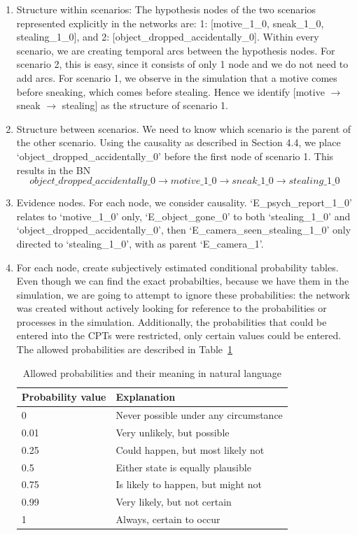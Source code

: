 \documentclass[12pt]{article}
\begin{document}
 \begin{enumerate} 
 
\item Structure within scenarios: The hypothesis nodes of the two scenarios represented explicitly in the networks are: 1: [motive\_1\_0, sneak\_1\_0, stealing\_1\_0], and 2: [object\_dropped\_accidentally\_0]. Within every scenario, we are creating temporal arcs between the hypothesis nodes. For scenario 2, this is easy, since it consists of only 1 node and we do not need to add arcs. For scenario 1, we observe in the simulation that a motive comes before sneaking, which comes before stealing. Hence we identify [motive $\rightarrow$ sneak $\rightarrow$ stealing] as the structure of scenario 1.

\item Structure between scenarios. We need to know which scenario is the parent of the other scenario. Using the causality as described in Section 4.4, we place `object\_dropped\_accidentally\_0' before the first node of scenario 1. This results in the BN \[object\_dropped\_accidentally\_0 \rightarrow motive\_1\_0 \rightarrow sneak\_1\_0 \rightarrow stealing\_1\_0\]

\item Evidence nodes. For each node, we consider causality. `E\_psych\_report\_1\_0' relates to `motive\_1\_0' only, `E\_object\_gone\_0' to both `stealing\_1\_0' and `object\_dropped\_accidentally\_0', then `E\_camera\_seen\_stealing\_1\_0' only directed to `stealing\_1\_0', with as parent `E\_camera\_1'. 

\item For each node, create subjectively estimated conditional probability tables. Even though we can find the exact probabilties, because we have them in the simulation, we are going to attempt to ignore these probabilities: the network was created without actively looking for reference to the probabilities or processes in the simulation. Additionally, the probabilities that could be entered into the CPTs were restricted, only certain values could be entered. The allowed probabilities are described in Table~\ref{atp}


\begin{table}[htbp]
\begin{center}
\begin{tabular}{|l|l|}
\hline
Probability value & Explanation \\
\hline
0 & Never possible under any circumstance \\
0.01 & Very unlikely, but possible \\
0.25 & Could happen, but most likely not \\
0.5 & Either state is equally plausible\\
0.75 & Is likely to happen, but might not \\
0.99 & Very likely, but not certain \\
1 & Always, certain to occur \\
\hline
\end{tabular}
\end{center}
\caption{Allowed probabilities and their meaning in natural language}
\label{atp}
\end{table}



\end{enumerate}
\end{document}
